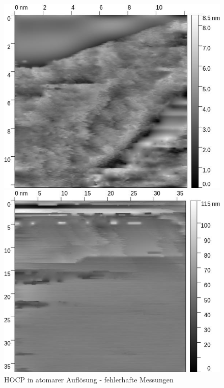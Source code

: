 \documentclass[12pt,a4paper]{scrartcl}
\numberwithin{equation}{section} %
\begin{document}
\begin{figure}[h!]
\begin{minipage}{\textwidth}
\begin{minipage}[t]{0.5\textwidth}
			\includegraphics[width=\textwidth]{../media/B2.5/Graphit_2.jpg}
		\end{minipage}
		\begin{minipage}[t]{0.5\textwidth}
			\centering
			\includegraphics[width=\textwidth]{../media/B2.5/Graphit_4.jpg}
		\end{minipage}
		\caption{HOCP in atomarer Auflösung - fehlerhafte Messungen}
		\label{abb:hocp own: atomar}
	\end{minipage}
\end{figure}
\end{document}
